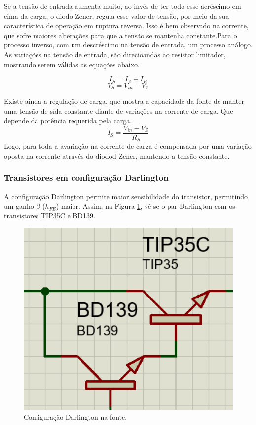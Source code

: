 \documentclass[a4paper,12pt,oneside,openany,table,xcdraw]{article}
\begin{document}
Se a tensão de entrada aumenta muito, ao invés de ter todo esse acréscimo em cima da carga, o diodo Zener, regula esse valor de tensão, por meio da sua característica de operação em ruptura reversa. Isso é bem observado na corrente, que sofre maiores alterações para que a tensão se mantenha constante.Para o processo inverso, com um descréscimo na tensão de entrada, um processo análogo. As variações na tensão de entrada, são direcioandas ao resistor limitador, mostrando serem válidas as equações abaixo.

\begin{equation}
I_{S}  = I_{Z} +I_{R}  
\end{equation}
\begin{equation}
V_{S}  = V_{in} - V_{Z}
\end{equation}

Existe ainda a  regulação de carga, que mostra a capacidade da fonte de manter uma tensão de sída constante diante de variações na corrente de carga. Que depende da potência requerida pela carga.
\begin{equation}
I_{S}  =\frac{ V_{in} - V_{Z}  }{R_{S}}
\end{equation}
Logo, para toda a avariação na corrente de carga é compensada por uma variação oposta na corrente através do diodod Zener, mantendo a tensão constante.

\subsubsection{Transistores em configuração Darlington}
A configuração Darlington permite maior sensibilidade do transistor, permitindo um ganho $\beta$ ($h_{FE}$) maior. Assim, na Figura \ref{fonte:darlington}, vê-se o par Darlington com os transistores TIP35C e BD139.

\begin{figure}[H]
\centering
  
\includegraphics[width=15cm]{fonte-darlington}
\caption{Configuração Darlington na fonte.}
\label{fonte:darlington}
\end{figure}
\end{document}
